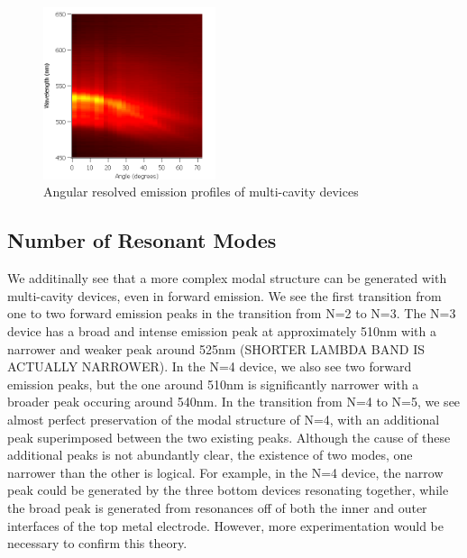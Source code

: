 \documentclass{report}
\begin{document}
\begin{figure}
            \includegraphics[width=0.45\textwidth]{images/n5_heatmap.png}
            \caption{Angular resolved emission profiles of multi-cavity devices}
		\end{figure}

    
        \subsection{Number of Resonant Modes}
        We additinally see that a more complex modal structure can be generated with multi-cavity devices, even in forward emission. We see the first transition from one to two forward emission peaks in the transition from N=2 to N=3. The N=3 device has a broad and intense emission peak at approximately 510nm with a narrower and weaker peak around 525nm (SHORTER LAMBDA BAND IS ACTUALLY NARROWER). In the N=4 device, we also see two forward emission peaks, but the one around 510nm is significantly narrower with a broader peak occuring around 540nm. In the transition from N=4 to N=5, we see almost perfect preservation of the modal structure of N=4, with an additional peak superimposed between the two existing peaks. Although the cause of these additional peaks is not abundantly clear, the existence of two modes, one narrower than the other is logical. For example, in the N=4 device, the narrow peak could be generated by the three bottom devices resonating together, while the broad peak is generated from resonances off of both the inner and outer interfaces of the top metal electrode. However, more experimentation would be necessary to confirm this theory.
        
\end{document}
